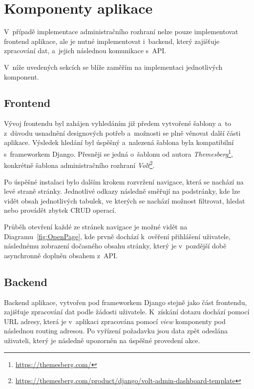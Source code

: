 \section{Komponenty aplikace}
\label{sec:implementation-components}
V~případě implementace administračního rozhraní nelze pouze implementovat frontend aplikace, ale je nutné implementovat i~backend, který zajišťuje zpracování dat, a~jejich následnou komunikace s~API\@.

V~níže uvedených sekcích se blíže zaměřím na implementaci jednotlivých komponent.

\subsection{Frontend}
\label{subsec:implementation-frontend}
Vývoj frontendu byl zahájen vyhledáním již předem vytvořené šablony a~to z~důvodu usnadnění designových potřeb a~možnosti se plně věnovat další části aplikace. Výsledek hledání byl úspěšný a~nalezená šablona byla kompatibilní s~frameworkem Django. Přesněji se jedná o~šablonu od autora \textit{Themesberg}\footnote{\href{https://themesberg.com/}{https://themesberg.com/}}, konkrétně šablona administračního rozhraní \textit{Volt}\footnote{\href{https://themesberg.com/product/django/volt-admin-dashboard-template}{https://themesberg.com/product/django/volt-admin-dashboard-template}}.

Po úspěšné instalaci bylo dalším krokem rozvržení navigace, která se nachází na levé straně stránky. Jednotlivé odkazy následně směřují na podstránky, kde lze vidět obsah jednotlivých tabulek, ve kterých se nachází možnost filtrovat, hledat nebo provádět zbytek CRUD operací.

Průběh otevření každé ze stránek navigace je možné vidět na Diagramu~\ref{fig:OpenPage}, kde prvně dochází k~ověření přihlášení uživatele, následnému zobrazení dočasného obsahu stránky, který je v~pozdější době asynchronně doplněn obsahem z~API\@.


\subsection{Backend}
\label{subsec:implementation-backend}
Backend aplikace, vytvořen pod frameworkem Django stejně jako část frontendu, zajišťuje zpracování dat podle žádosti uživatele. K~získání dotazu dochází pomocí URL adresy, která je v~aplikaci zpracována pomocí \textit{view} komponenty pod následnou routing adresou. Po vyřízení požadavku jsou data zpět odeslána uživateli, který je následně upozorněn na úspěšné provedení akce.

